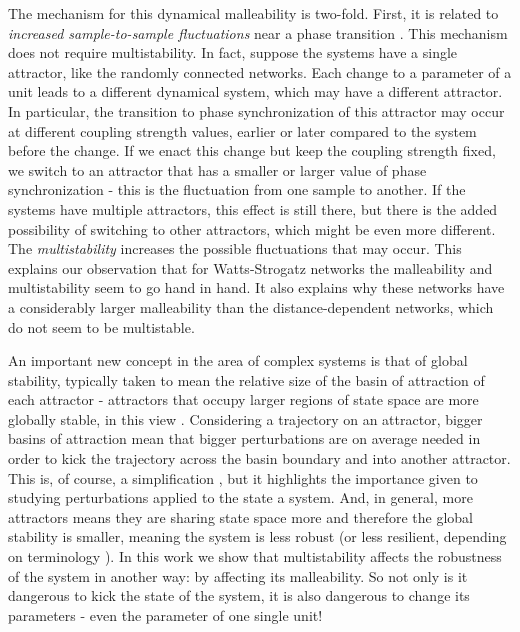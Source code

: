 The mechanism for this dynamical malleability is two-fold. First, it is related to \textit{increased sample-to-sample fluctuations} near a phase transition \cite{hong2007entrainment, hong2007finitesizescalingpre}. This mechanism does not require multistability. In fact, suppose the systems have a single attractor, like the randomly connected networks. Each change to a parameter of a unit leads to a different dynamical system, which may have a different attractor. In particular, the transition to phase synchronization of this attractor may occur at different coupling strength values, earlier or later compared to the system before the change. If we enact this change but keep the coupling strength fixed, we switch to an attractor that has a smaller or larger value of phase synchronization - this is the fluctuation from one sample to another. If the systems have multiple attractors, this effect is still there, but there is the added possibility of switching to other attractors, which might be even more different. The \textit{multistability} increases the possible fluctuations that may occur. This explains our observation that for Watts-Strogatz networks the malleability and multistability seem to go hand in hand. It also explains why these networks have a considerably larger malleability than the distance-dependent networks, which do not seem to be multistable.

An important new concept in the area of complex systems is that of global stability, typically taken to mean the relative size of the basin of attraction of each attractor - attractors that occupy larger regions of state space are more globally stable, in this view \cite{menck2013how}. Considering a trajectory on an attractor, bigger basins of attraction mean that bigger perturbations are on average needed in order to kick the trajectory across the basin boundary and into another attractor. This is, of course, a simplification \cite{krakovska2023resilience}, but it highlights the importance given to studying perturbations applied to the state a system. And, in general, more attractors means they are sharing state space more and therefore the global stability is smaller, meaning the system is less robust (or less resilient, depending on terminology \cite{krakovska2023resilience}). In this work we show that multistability affects the robustness of the system in another way: by affecting its malleability. So not only is it dangerous to kick the state of the system, it is also dangerous to change its parameters - even the parameter of one single unit!

